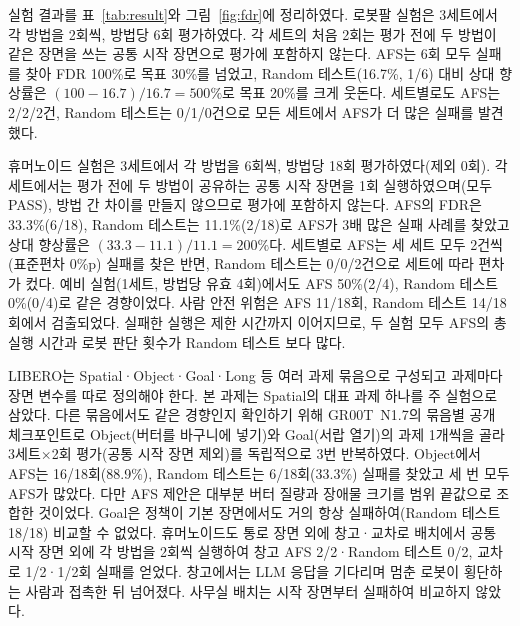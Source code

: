 실험 결과를 표~\ref{tab:result}와 그림~\ref{fig:fdr}에 정리하였다. 
로봇팔 실험은 3세트에서 각 방법을 2회씩, 방법당 6회 평가하였다. 
각 세트의 처음 2회는 평가 전에 두 방법이 같은 장면을 쓰는 공통 시작 장면으로 평가에 포함하지 않는다. 
AFS는 6회 모두 실패를 찾아 FDR 100\%로 목표 30\%를 넘었고, Random 테스트(16.7\%, 1/6) 대비 상대 향상률은 $(100-16.7)/16.7 = 500\%$로 목표 20\%를 크게 웃돈다. 
세트별로도 AFS는 2/2/2건, Random 테스트는 0/1/0건으로 모든 세트에서 AFS가 더 많은 실패를 발견했다.

휴머노이드 실험은 3세트에서 각 방법을 6회씩, 방법당 18회 평가하였다(제외 0회). 
각 세트에서는 평가 전에 두 방법이 공유하는 공통 시작 장면을 1회 실행하였으며(모두 PASS), 방법 간 차이를 만들지 않으므로 평가에 포함하지 않는다.
AFS의 FDR은 33.3\%(6/18), Random 테스트는 11.1\%(2/18)로 AFS가 3배 많은 실패 사례를 찾았고 상대 향상률은 $(33.3-11.1)/11.1 = 200\%$다.
세트별로 AFS는 세 세트 모두 2건씩(표준편차 0\%p) 실패를 찾은 반면, Random 테스트는 0/0/2건으로 세트에 따라 편차가 컸다. 
예비 실험(1세트, 방법당 유효 4회)에서도 AFS 50\%(2/4), Random 테스트 0\%(0/4)로 같은 경향이었다. 
사람 안전 위험은 AFS 11/18회, Random 테스트 14/18회에서 검출되었다.
실패한 실행은 제한 시간까지 이어지므로, 두 실험 모두 AFS의 총 실행 시간과 로봇 판단 횟수가 Random 테스트 보다 많다.

LIBERO는 Spatial·Object·Goal·Long 등 여러 과제 묶음으로 구성되고 과제마다 장면 변수를 따로 정의해야 한다.
본 과제는 Spatial의 대표 과제 하나를 주 실험으로 삼았다. 
다른 묶음에서도 같은 경향인지 확인하기 위해 GR00T~N1.7의 묶음별 공개 체크포인트로 Object(버터를 바구니에 넣기)와 Goal(서랍 열기)의 과제 1개씩을 골라 3세트$\times$2회 평가(공통 시작 장면 제외)를 독립적으로 3번 반복하였다.
Object에서 AFS는 16/18회(88.9\%), Random 테스트는 6/18회(33.3\%) 실패를 찾았고 세 번 모두 AFS가 많았다. 
다만 AFS 제안은 대부분 버터 질량과 장애물 크기를 범위 끝값으로 조합한 것이었다. 
Goal은 정책이 기본 장면에서도 거의 항상 실패하여(Random 테스트 18/18) 비교할 수 없었다.
휴머노이드도 통로 장면 외에 창고·교차로 배치에서 공통 시작 장면 외에 각 방법을 2회씩 실행하여 창고 AFS 2/2·Random 테스트 0/2, 교차로 1/2·1/2회 실패를 얻었다.
창고에서는 LLM 응답을 기다리며 멈춘 로봇이 횡단하는 사람과 접촉한 뒤 넘어졌다. 사무실 배치는 시작 장면부터 실패하여 비교하지 않았다.

